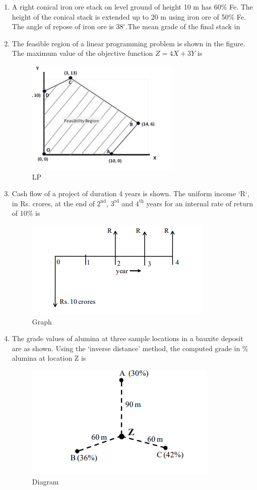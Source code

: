 \documentclass[journal,12pt,onecolumn]{IEEEtran}
\theoremstyle{remark}
\begin{document}
\begin{enumerate}
\item A right conical iron ore stack on level ground of height 10 m has 60\% Fe. The height of the conical stack is extended up to 20 m using iron ore of 50\% Fe. The angle of repose of iron ore is $38^\circ$.The mean grade of the final stack in %
\hfill{}

\item The feasible region of a linear programming problem is shown in the figure. The maximum value of the objective function $Z=4X+3Y$ is 
\begin{figure}[H]
  \centering
  \includegraphics[width=0.4\columnwidth]{figs/LP.png}
  \caption{LP}
  \label{fig:LP}
\end{figure}
\hfill{}


\item Cash flow of a project of duration 4 years is shown. The uniform income `R`, in Rs. crores, 
at the end of $2^{\text{nd}}$, $3^{\text{rd}}$ and $4^{\text{th}}$ years for an internal rate of return of 10\% is
\begin{figure}[H]
  \centering
  \includegraphics[width=0.4\columnwidth]{figs/Graph2.png}
  \caption{Graph}
  \label{fig:g2}
\end{figure}

\hfill{}

\item The grade values of alumina at three sample locations  in a bauxite 
deposit are as shown. Using the `inverse distance' method, the computed grade  in \% alumina at location Z is


\hfill{}
\begin{figure}[H]
  \centering
  \includegraphics[width=0.4\columnwidth]{figs/figure1.png}
  \caption{Diagram}
  \label{fig:figure1}
\end{figure}


\end{enumerate}
\end{document}
